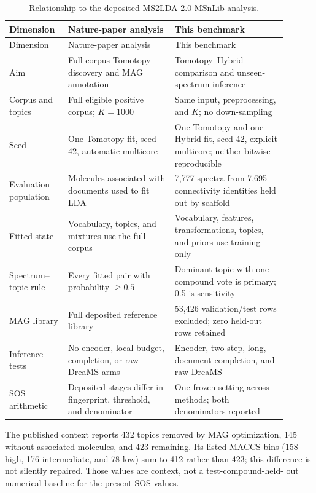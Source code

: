 \documentclass[11pt]{article}
\begin{document}
\small
\begin{longtable}{L{0.18\linewidth}L{0.35\linewidth}L{0.37\linewidth}}
\caption{Relationship to the deposited MS2LDA 2.0 MSnLib analysis.}
\label{tab:nature-comparison}\\
\toprule
Dimension & Nature-paper analysis & This benchmark \\
\midrule
\endfirsthead
\toprule
Dimension & Nature-paper analysis & This benchmark \\
\midrule
\endhead
Aim & Full-corpus Tomotopy discovery and MAG annotation & Tomotopy--Hybrid
comparison and unseen-spectrum inference \\
Corpus and topics & Full eligible positive corpus; $K=1000$ & Same input,
preprocessing, and $K$; no down-sampling \\
Seed & One Tomotopy fit, seed 42, automatic multicore & One Tomotopy and one
Hybrid fit, seed 42, explicit multicore; neither bitwise reproducible \\
Evaluation population & Molecules associated with documents used to fit LDA &
7,777 spectra from 7,695 connectivity identities held out by scaffold \\
Fitted state & Vocabulary, topics, and mixtures use the full corpus &
Vocabulary, features, transformations, topics, and priors use training only \\
Spectrum--topic rule & Every fitted pair with probability $\geq0.5$ &
Dominant topic with one compound vote is primary; 0.5 is sensitivity \\
MAG library & Full deposited reference library & 53,426 validation/test rows
excluded; zero held-out rows retained \\
Inference tests & No encoder, local-budget, completion, or raw-DreaMS arms &
Encoder, two-step, long, document completion, and raw DreaMS \\
SOS arithmetic & Deposited stages differ in fingerprint, threshold, and
denominator & One frozen setting across methods; both denominators reported \\
\bottomrule
\end{longtable}
\normalsize

The published context reports 432 topics removed by MAG optimization, 145
without associated molecules, and 423 remaining. Its listed MACCS bins (158
high, 176 intermediate, and 78 low) sum to 412 rather than 423; this difference
is not silently repaired. Those values are context, not a test-compound-held-
out numerical baseline for the present SOS values.
\end{document}
